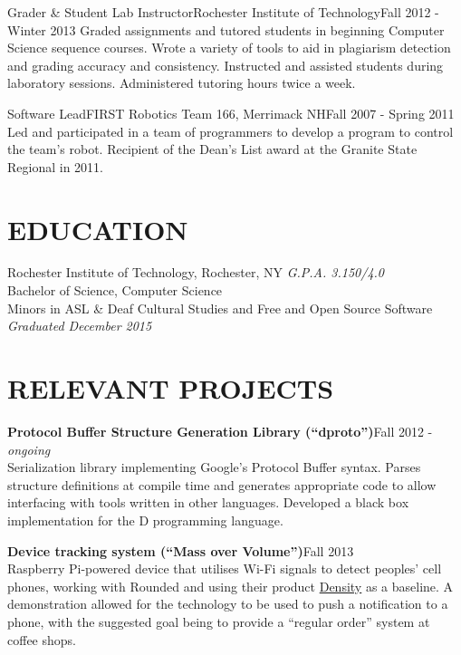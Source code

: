\documentclass[line]{res}
\newcommand{\project}[2][]{{\bf #2}\hfill #1\\}
\def\ongoing{\textit{ongoing}}
\begin{document}
\begin{resume}
	\begin{job}{Grader \& Student Lab Instructor}{Rochester Institute of Technology}{Fall 2012 - Winter 2013}
		Graded assignments and tutored students in beginning Computer Science sequence courses.
		Wrote a variety of tools to aid in plagiarism detection and grading accuracy and consistency.
		Instructed and assisted students during laboratory sessions.
		Administered tutoring hours twice a week.
	\end{job}

	\begin{job}{Software Lead}{FIRST Robotics Team 166, Merrimack NH}{Fall 2007 - Spring 2011}
		Led and participated in a team of programmers to develop a program to control the team's robot.
		Recipient of the Dean's List award at the Granite State Regional in 2011.
	\end{job}

\section{EDUCATION}

	Rochester Institute of Technology, Rochester, NY
	\hfill
	\textit{G.P.A. 3.150/4.0}
	\\
	Bachelor of Science, Computer Science
	\\
	Minors in ASL \& Deaf Cultural Studies and Free and Open Source Software
	\hfill
	\textit{Graduated December 2015}

\section{RELEVANT PROJECTS}

	\project[Fall 2012 - \ongoing]   {Protocol Buffer Structure Generation Library (``dproto'')}
	Serialization library implementing Google's Protocol Buffer syntax.
	Parses structure definitions at compile time and generates appropriate code to allow interfacing with tools written in other languages.
	Developed a black box implementation for the D programming language.

	\project[Fall 2013]              {Device tracking system (``Mass over Volume'')}
	Raspberry Pi-powered device that utilises Wi-Fi signals to detect peoples' cell phones, working with Rounded and using their product \href{http://density.io}{Density} as a baseline.
	A demonstration allowed for the technology to be used to push a notification to a phone, with the suggested goal being to provide a ``regular order'' system at coffee shops.


\end{resume}
\end{document}
